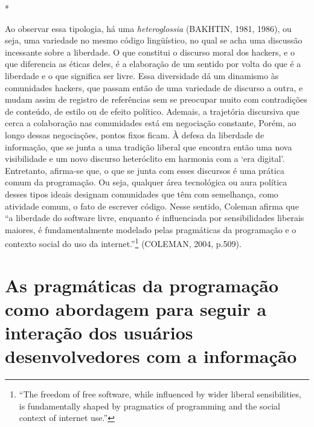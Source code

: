 \begin{center}
*
\end{center}

Ao observar essa tipologia, há uma \emph{heteroglossia} (BAKHTIN, 1981, 1986), ou seja, uma variedade no mesmo código lingüístico, no qual se acha uma discussão incessante sobre a liberdade. O que constitui o discurso moral dos hackers, e o que diferencia as éticas deles, é a elaboração de um sentido por volta do que é a liberdade e o que significa ser livre. Essa diversidade dá um dinamismo às comunidades hackers, que passam então de uma variedade de discurso a outra, e mudam assim de registro de referências sem se preocupar muito com contradições de conteúdo, de estilo ou de efeito político. Ademais, a trajetória discursiva que cerca a colaboração nas comunidades está em negociação constante, Porém, ao longo dessas negociações, pontos fixos ficam. À defesa da liberdade de informação, que se junta a uma tradição liberal que encontra então uma nova visibilidade e um novo discurso heteróclito em harmonia com a ‘era digital’. Entretanto, afirma-se que, o que se junta com esses discursos é uma prática comum da programação. Ou seja, qualquer área tecnológica ou aura política desses tipos ideais designam comunidades que têm com semelhança, como atividade comum, o fato de escrever código. Nesse sentido, Coleman afirma que “a liberdade do software livre, enquanto é influenciada por sensibilidades liberais maiores, é fundamentalmente modelado pelas pragmáticas da programação e o contexto social do uso da internet.”\footnote{“The freedom of free software, while influenced by wider liberal sensibilities, is fundamentally shaped by pragmatics of programming and the social context of internet use.”} (COLEMAN, 2004, p.509).

\section{As pragmáticas da programação como abordagem para seguir a interação dos usuários desenvolvedores com a informação} \label{2.3}

